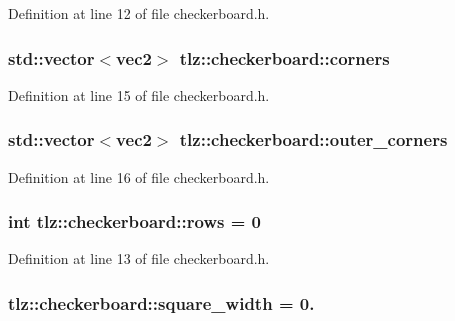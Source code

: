 Definition at line 12 of file checkerboard.\+h.

\subsubsection[{\texorpdfstring{corners}{corners}}]{\setlength{\rightskip}{0pt plus 5cm}std\+::vector$<${\bf vec2}$>$ tlz\+::checkerboard\+::corners}\hypertarget{structtlz_1_1checkerboard_ae747cabacc7e1ff435bb968957687da6}{}\label{structtlz_1_1checkerboard_ae747cabacc7e1ff435bb968957687da6}


Definition at line 15 of file checkerboard.\+h.

\subsubsection[{\texorpdfstring{outer\+\_\+corners}{outer_corners}}]{\setlength{\rightskip}{0pt plus 5cm}std\+::vector$<${\bf vec2}$>$ tlz\+::checkerboard\+::outer\+\_\+corners}\hypertarget{structtlz_1_1checkerboard_a1cb1310cab61e136082911262d61f5c6}{}\label{structtlz_1_1checkerboard_a1cb1310cab61e136082911262d61f5c6}


Definition at line 16 of file checkerboard.\+h.

\subsubsection[{\texorpdfstring{rows}{rows}}]{\setlength{\rightskip}{0pt plus 5cm}int tlz\+::checkerboard\+::rows = 0}\hypertarget{structtlz_1_1checkerboard_ab24465de0c0363ea43cfb7a1c46ac888}{}\label{structtlz_1_1checkerboard_ab24465de0c0363ea43cfb7a1c46ac888}


Definition at line 13 of file checkerboard.\+h.

\subsubsection[{\texorpdfstring{square\+\_\+width}{square_width}}]{ tlz\+::checkerboard\+::square\+\_\+width = 0.}\hypertarget{structtlz_1_1checkerboard_ad0ddf1ae750bd40ca7310a2552ea5a4f}{}\label{structtlz_1_1checkerboard_ad0ddf1ae750bd40ca7310a2552ea5a4f}


